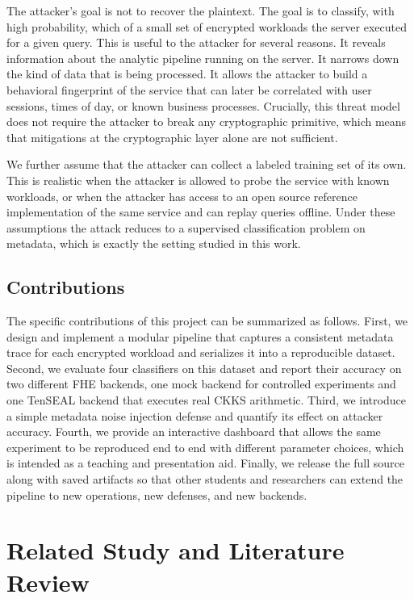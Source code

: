 \documentclass[12pt,a4paper]{article}
\begin{document}
The attacker's goal is not to recover the plaintext. The goal is to classify, with high probability, which of a small set of encrypted workloads the server executed for a given query. This is useful to the attacker for several reasons. It reveals information about the analytic pipeline running on the server. It narrows down the kind of data that is being processed. It allows the attacker to build a behavioral fingerprint of the service that can later be correlated with user sessions, times of day, or known business processes. Crucially, this threat model does not require the attacker to break any cryptographic primitive, which means that mitigations at the cryptographic layer alone are not sufficient.

We further assume that the attacker can collect a labeled training set of its own. This is realistic when the attacker is allowed to probe the service with known workloads, or when the attacker has access to an open source reference implementation of the same service and can replay queries offline. Under these assumptions the attack reduces to a supervised classification problem on metadata, which is exactly the setting studied in this work.

\subsection{Contributions}
The specific contributions of this project can be summarized as follows. First, we design and implement a modular pipeline that captures a consistent metadata trace for each encrypted workload and serializes it into a reproducible dataset. Second, we evaluate four classifiers on this dataset and report their accuracy on two different FHE backends, one mock backend for controlled experiments and one TenSEAL backend that executes real CKKS arithmetic. Third, we introduce a simple metadata noise injection defense and quantify its effect on attacker accuracy. Fourth, we provide an interactive dashboard that allows the same experiment to be reproduced end to end with different parameter choices, which is intended as a teaching and presentation aid. Finally, we release the full source along with saved artifacts so that other students and researchers can extend the pipeline to new operations, new defenses, and new backends.

\section{Related Study and Literature Review}
\end{document}
